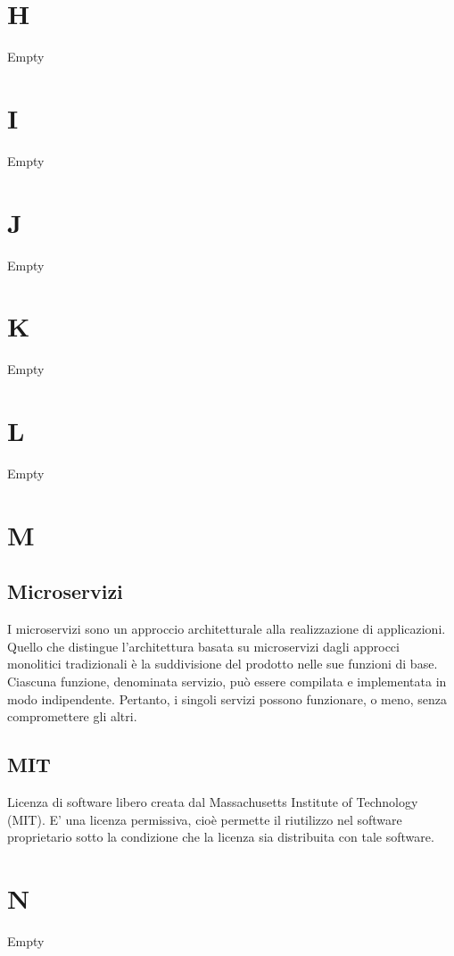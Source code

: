 \section*{H}
Empty

\section*{I}
Empty

\section*{J}
Empty

\section*{K}
Empty

\section*{L}
Empty

\section*{M}
\subsection*{Microservizi}
I microservizi sono un approccio architetturale alla realizzazione di applicazioni. 
Quello che distingue l'architettura basata su microservizi dagli approcci monolitici tradizionali 
è la suddivisione del prodotto nelle sue funzioni di base. Ciascuna funzione, denominata servizio, può essere 
compilata e implementata in modo indipendente. Pertanto, i singoli servizi possono funzionare, o meno, senza compromettere gli altri.

\subsection*{MIT}
Licenza di software libero creata dal Massachusetts Institute of Technology (MIT).
E' una licenza permissiva, cioè permette il riutilizzo nel software proprietario sotto la condizione che la licenza sia distribuita con tale software.

\section*{N}
Empty

